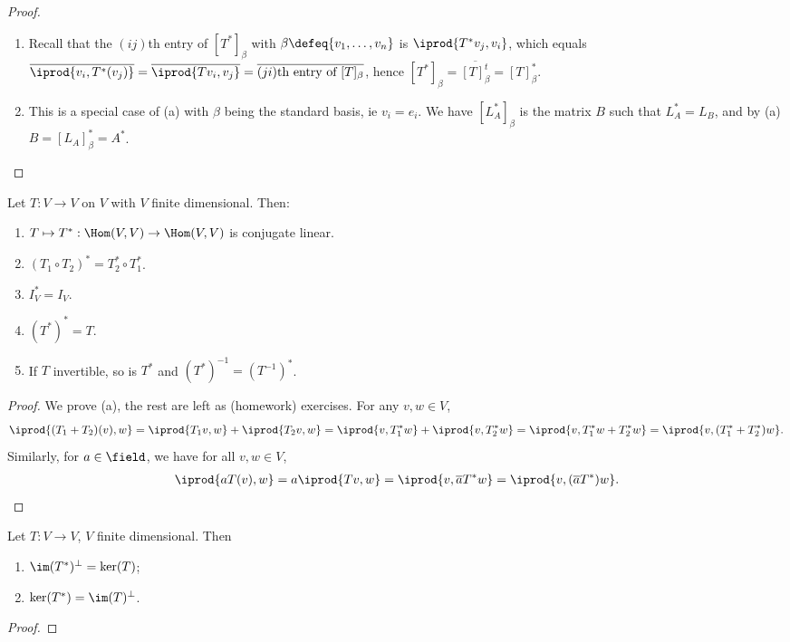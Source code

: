 \begin{proof}
    \begin{enumerate}[label=(\alph*)]
        \item Recall that the $(ij)$th entry of $[T^\ast]_\beta$ with $\beta \defeq \{v_1, \dots, v_n\}$ is $\iprod{T^\ast v_j, v_i}$, which equals $\overline{\iprod{v_i, T^\ast(v_j)}} = \overline{\iprod{Tv_i, v_j}} = \overline{(ji)\text{th entry of $[T]_\beta$}}$, hence $[T^\ast]_\beta = \overline{[T]_\beta^t} = [T]_\beta^\ast$.

        \item This is a special case of (a) with $\beta$ being the standard basis, ie $v_i = e_i$. We have $[L_A^\ast]_\beta$ is the matrix $B$ such that $L_A^\ast = L_B$, and by (a) $B = [L_A]_\beta^\ast = A^\ast$.
    \end{enumerate}
\end{proof}

\begin{proposition}
    Let $T : V \to V$ on $V$ with $V$ finite dimensional. Then: \begin{enumerate}[label=(\alph*)]
        \item $T \mapsto T^\ast : \Hom(V, V) \to \Hom(V, V)$ is conjugate linear.
        \item $(T_1 \circ T_2)^\ast = T_2^\ast \circ T_1^\ast$.
        \item $I_V^\ast = I_V$.
        \item $(T^\ast)^\ast = T$.
        \item If $T$ invertible, so is $T^\ast$ and $(T^\ast)^{-1} = (T^{-1})^\ast$.
    \end{enumerate}
\end{proposition}

\begin{proof}
    We prove (a), the rest are left as (homework) exercises. For any $v, w \in V$, \begin{align*}
        \iprod{(T_1 + T_2)(v), w} = \iprod{T_1 v, w} + \iprod{T_2 v, w} = \iprod{v, T_1^\ast w} + \iprod{v, T_2^\ast w} = \iprod{v, T_1^\ast w + T_2^\ast w} = \iprod{v, (T_1^\ast + T_2^\ast)w}.
    \end{align*}
    Similarly, for $a \in \field$, we have for all $v, w \in V$, \begin{align*}
        \iprod{aT(v), w} = a \iprod{Tv, w} = \iprod{v, \overline{a} T^\ast w} = \iprod{v, (\overline{a}T^\ast) w}.
    \end{align*}
\end{proof}

\begin{proposition}
    Let $T : V \to V$, $V$ finite dimensional. Then \begin{enumerate}[label=(\alph*)]
        \item $\im(T^\ast)^\perp = \ker(T)$;
        \item $\ker(T^\ast) = \im(T)^\perp$.
    \end{enumerate}
\end{proposition}
\begin{proof}
\end{proof}



